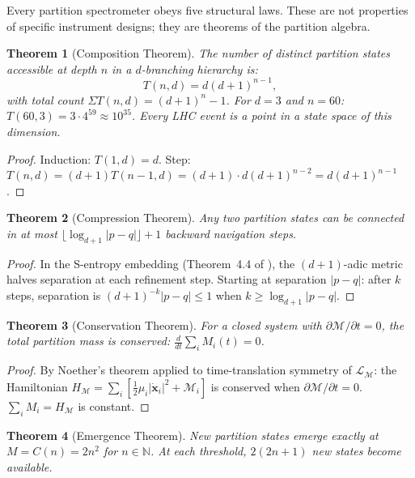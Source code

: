 \documentclass[twocolumn,10pt,a4paper]{article}
\theoremstyle{thmstyle}
\newtheorem{theorem}{Theorem}[section]
\theoremstyle{definition}
\theoremstyle{remark}
\newcommand{\N}{\mathbb{N}}
\newcommand{\LM}{\mathcal{L}_{\mathcal{M}}}
\newcommand{\Mop}{\mathcal{M}}
\begin{document}
Every partition spectrometer obeys five structural laws. These are not
properties of specific instrument designs; they are theorems of the
partition algebra.

\begin{theorem}[Composition Theorem]
\label{thm:composition}
The number of distinct partition states accessible at depth $n$ in a
$d$-branching hierarchy is:
\begin{equation}
T(n,d) = d(d+1)^{n-1},
\label{eq:composition_thm}
\end{equation}
with total count $\Sigma T(n,d) = (d+1)^n - 1$. For $d = 3$ and $n = 60$:
$T(60,3) = 3\cdot4^{59} \approx 10^{35}$. Every LHC event is a point
in a state space of this dimension.
\end{theorem}

\begin{proof}
Induction: $T(1,d) = d$. Step:
$T(n,d) = (d+1)T(n-1,d) = (d+1)\cdot d(d+1)^{n-2} = d(d+1)^{n-1}$.
\end{proof}

\begin{theorem}[Compression Theorem]
\label{thm:compression}
Any two partition states can be connected in at most
$\lfloor\log_{d+1}|p - q|\rfloor + 1$ backward navigation steps.
\end{theorem}

\begin{proof}
In the S-entropy embedding (Theorem~4.4 of \citealt{companion:trajectory}),
the $(d+1)$-adic metric halves separation at each refinement step.
Starting at separation $|p-q|$: after $k$ steps, separation is
$(d+1)^{-k}|p-q| \leq 1$ when $k \geq \log_{d+1}|p-q|$.
\end{proof}

\begin{theorem}[Conservation Theorem]
\label{thm:conservation}
For a closed system with $\partial\Mop/\partial t = 0$, the total
partition mass is conserved:
$\tfrac{d}{dt}\sum_i M_i(t) = 0$.
\end{theorem}

\begin{proof}
By Noether's theorem applied to time-translation symmetry of $\LM$:
the Hamiltonian $H_\mathcal{M} = \sum_i[\tfrac{1}{2}\mu_i|\dot{\mathbf{x}}_i|^2
+ \Mop_i]$ is conserved when $\partial\Mop/\partial t = 0$.
$\sum_i M_i = H_\mathcal{M}$ is constant.
\end{proof}

\begin{theorem}[Emergence Theorem]
\label{thm:emergence}
New partition states emerge exactly at $M = C(n) = 2n^2$ for $n \in \N$.
At each threshold, $2(2n+1)$ new states become available.
\end{theorem}
\end{document}
